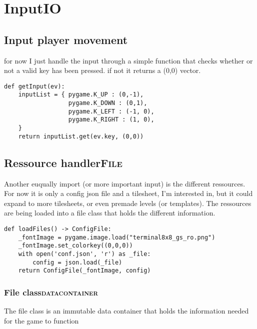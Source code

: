 \documentclass[11pt]{article}
\begin{document}
\section{Input\hfill{}\textsc{IO}}
\label{sec:orgd7be312}

\subsection{Input player movement}
\label{sec:org6d977e0}

for now I just handle the input through a simple function that checks whether or not a valid key has been pressed. if not it returns a (0,0) vector. 

\begin{verbatim}
def getInput(ev):
    inputList = { pygame.K_UP : (0,-1),
                  pygame.K_DOWN : (0,1),
                  pygame.K_LEFT : (-1, 0),
                  pygame.K_RIGHT : (1, 0),
    }
    return inputList.get(ev.key, (0,0))
\end{verbatim}





\subsection{Ressource handler\hfill{}\textsc{File}}
\label{sec:org9dede2f}

Another euqually import (or more important input) is the different ressources. For now it is only a config json file and a tilesheet, I'm interested in, but it could expand to more tilesheets, or even premade levels (or templates). The ressources are being loaded into a file class that holds the different information.

\begin{verbatim}
def loadFiles() -> ConfigFile:
    _fontImage = pygame.image.load("terminal8x8_gs_ro.png")
    _fontImage.set_colorkey((0,0,0))
    with open('conf.json', 'r') as _file:
        config = json.load(_file)
    return ConfigFile(_fontImage, config)
\end{verbatim}

\subsubsection{File class\hfill{}\textsc{datacontainer}}
\label{sec:orgbd547a6}

The file class is an immutable data container that holds the information needed for the game to function
\end{document}
